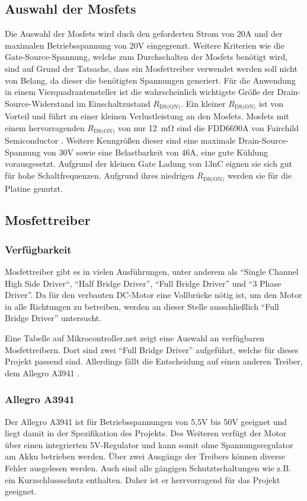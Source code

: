 \subsection{Auswahl der Mosfets}
Die Auswahl der Mosfets wird duch den geforderten Strom von 20A und der maximalen Betriebsspannung von 20V eingegrenzt. Weitere Kriterien wie die Gate-Source-Spannung, welche zum Durchschalten
der Mosfets benötigt wird, sind auf Grund der Tatsache, dass ein Mosfettreiber verwendet werden soll nicht von Belang, da dieser die benötigten Spannungen generiert.
Für die Anwendung in einem Vierquadrantensteller ist die wahrscheinlich wichtigste Größe der Drain-Source-Widerstand im Einschaltzustand $R_{\text{DS(ON)}}$.
Ein kleiner $R_{\text{DS(ON)}}$ ist von Vorteil und führt zu einer kleinen Verlustleistung an den Mosfets.
Mosfets mit einem hervorragenden $R_{\text{DS(ON)}}$ von nur \SI{12}{\mohm} sind die FDD6690A von Fairchild Semiconductor \cite{ds-fs}. Weitere Kenngrößen dieser sind
eine maximale Drain-Source-Spannung von 30V sowie eine Belastbarkeit von 46A, eine gute Kühlung vorausgesetzt. Aufgrund der kleinen Gate Ladung von 13nC eignen
sie sich gut für hohe Schaltfrequenzen. Aufgrund ihres niedrigen $R_{\text{DS(ON)}}$ werden sie für die Platine genutzt.


\subsection{Mosfettreiber}

\subsubsection{Verfügbarkeit}

Mosfettreiber gibt es in vielen Ausführungen, unter anderem als ``Single Channel High Side Driver``, ``Half Bridge Driver'', ``Full Bridge Driver''
und ``3 Phase Driver''. Da für den verbauten DC-Motor eine Vollbrücke nötig ist, um den Motor in alle Richtungen zu betreiben, werden an dieser Stelle
ausschließlich ``Full Bridge Driver'' untersucht.

Eine Tabelle auf Mikrocontroller.net\cite{FET_D_TABLE} zeigt eine Auswahl an verfügbaren Mosfettreibern. Dort sind zwei
``Full Bridge Driver'' aufgeführt, welche für dieses Projekt passend sind. Allerdings fällt die Entscheidung auf einen anderen Treiber,
dem Allegro A3941 \cite{ds-A3941}.
\subsubsection{Allegro A3941}
Der Allegro A3941  ist für Betriebsspannungen von 5,5V bis 50V geeignet und liegt damit in der Spezifikation des Projekts.
Des Weiteren verfügt der Motor über einen integrierten 5V-Regulator und kann somit ohne Spannungsregulator am Akku betrieben werden.
Über zwei Ausgänge der Treibers können diverse Fehler ausgelesen werden. Auch sind alle gängigen Schutztschaltungen wie z.B. ein Kurzschlussschutz enthalten.
Daher ist er herrvorragend für das Projekt geeignet.



